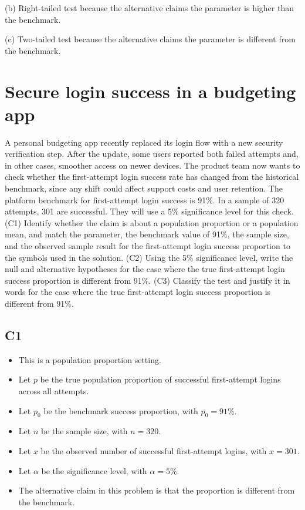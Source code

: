 \begin{ExamProblems}
		(b) Right-tailed test because the alternative claims the parameter is higher than the benchmark.\RightTailGraph
		
		(c) Two-tailed test because the alternative claims the parameter is different from the benchmark.\TwoTailGraph
		
		\item
		\section{Secure login success in a budgeting app}
		A personal budgeting app recently replaced its login flow with a new security verification step. After the update, some users reported both failed attempts and, in other cases, smoother access on newer devices. The product team now wants to check whether the first-attempt login success rate has changed from the historical benchmark, since any shift could affect support costs and user retention. The platform benchmark for first-attempt login success is 91\%. In a sample of 320 attempts, 301 are successful. They will use a 5\% significance level for this check. (C1) Identify whether the claim is about a population proportion or a population mean, and match the parameter, the benchmark value of 91\%, the sample size, and the observed sample result for the first-attempt login success proportion to the symbols used in the solution. (C2) Using the 5\% significance level, write the null and alternative hypotheses for the case where the true first-attempt login success proportion is different from 91\%. (C3) Classify the test and justify it in words for the case where the true first-attempt login success proportion is different from 91\%.
		
		\subsection*{C1}
		\begin{itemize}
			\item This is a population proportion setting.
			\item Let \(p\) be the true population proportion of successful first-attempt logins across all attempts.
			\item Let \(p_0\) be the benchmark success proportion, with \(p_0=91\%\).
			\item Let \(n\) be the sample size, with \(n=320\).
			\item Let \(x\) be the observed number of successful first-attempt logins, with \(x=301\).
			\item Let \(\alpha\) be the significance level, with \(\alpha=5\%\).
			\item The alternative claim in this problem is that the proportion is different from the benchmark.
		\end{itemize}
		

\end{ExamProblems}
